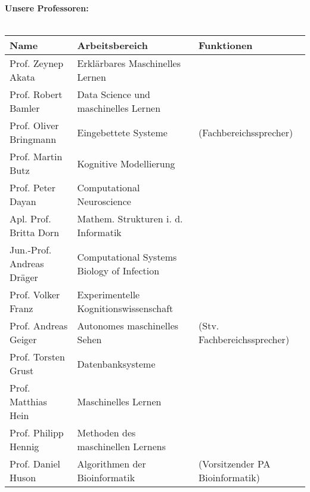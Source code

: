 \renewcommand{\arraystretch}{1}
\scriptsize
\textbf{Unsere Professoren:}\\\\
\begin{tabular}{|lll|}
	\hline
	Name                             & Arbeitsbereich                                        & Funktionen                               \\
	\hline
	\hline
	Prof. Zeynep Akata               & Erklärbares Maschinelles Lernen                       &                                          \\
	Prof. Robert Bamler              & Data Science und maschinelles Lernen                  &                                          \\
	Prof. Oliver Bringmann           & Eingebettete Systeme                                  & (Fachbereichssprecher)                   \\
	Prof. Martin Butz                & Kognitive Modellierung                                &                                          \\
	Prof. Peter Dayan                & Computational Neuroscience                            &                                          \\
	Apl. Prof. Britta Dorn           & Mathem. Strukturen i. d. Informatik                   &                                          \\
	Jun.-Prof. Andreas Dräger        & Computational Systems Biology of Infection            &                                          \\
	Prof. Volker Franz               & Experimentelle Kognitionswissenschaft                 &                                          \\
	Prof. Andreas Geiger             & Autonomes maschinelles Sehen                          & (Stv. Fachbereichssprecher)              \\
	Prof. Torsten Grust              & Datenbanksysteme                                      &                                          \\
	Prof. Matthias Hein              & Maschinelles Lernen                                   &                                          \\
	Prof. Philipp Hennig             & Methoden des maschinellen Lernens                     &                                          \\
	Prof. Daniel Huson               & Algorithmen der Bioinformatik                         & (Vorsitzender PA Bioinformatik)          \\

\end{tabular}
